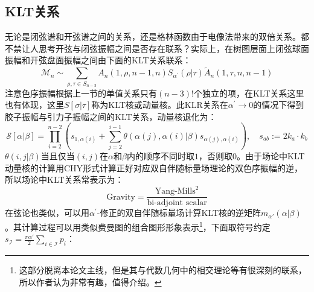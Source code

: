 \subsection{KLT关系}
无论是闭弦谱和开弦谱之间的关系，还是格林函数由于电像法带来的双倍关系。都不禁让人思考开弦与闭弦振幅之间是否存在联系？实际上，在树图层面上闭弦球面振幅和开弦盘面振幅之间由下面的KLT关系联系：
\begin{equation}
	\mathcal{M}_n\sim\sum_{\rho,\tau\in S_{n-3}}A_n(1,\rho,n-1,n)S_{\alpha^{\prime}}(\rho|\tau)\tilde A_n(1,\tau,n,n-1)
\end{equation}
注意色序振幅根据上一节的单值关系只有$(n-3)!$个独立的项，在KLT关系这里也有体现，这里$S[\sigma|\tau]$称为KLT核或动量核。此KLR关系在$\alpha^\prime\to 0$的情况下得到胶子振幅与引力子振幅之间的KLT关系，动量核退化为：
\begin{equation}
	\mathcal{S}[\alpha|\beta]=\prod_{i=2}^{n-2}\left(s_{1,\alpha(i)}+\sum_{j=2}^{i-1}\theta(\alpha(j),\alpha(i)|\beta) s_{\alpha(j),\alpha(i)}\right),\quad s_{ab}:=2k_a\cdot k_b
\end{equation}
$\theta\left(i,j|\beta\right)$当且仅当$(i,j)$在$\alpha$和$\beta$内的顺序不同时取$1$，否则取$0$。由于场论中KLT动量核的计算用CHY形式计算正好对应双自伴随标量场理论的双色序振幅的逆\cite{Cachazo:2013gna,Cachazo:2013iea,Cachazo:2013hca}，所以场论中KLT关系常表示为：
\begin{equation*}
	\text{Gravity}=\frac{\text{Yang-Mills}^2}{\text{bi-adjoint scalar}}
\end{equation*}
在弦论也类似，可以用$\alpha^\prime$-修正的双自伴随标量场计算KLT核的逆矩阵$m_{\alpha'}(\alpha|\beta)$\cite{Mizera:2016jhj,Mizera:2017cqs,Massidda:2024krv}。其计算过程可以用类似费曼图的组合图形形象表示\footnote{这部分脱离本论文主线，但是其与代数几何中的相交理论等有很深刻的联系，所以作者认为非常有趣，值得介绍。}，下面取符号约定$s_{\mathcal{I}}=\frac{\pi\alpha'}{2}\sum_{i\in\mathcal{I}}p_i$：
